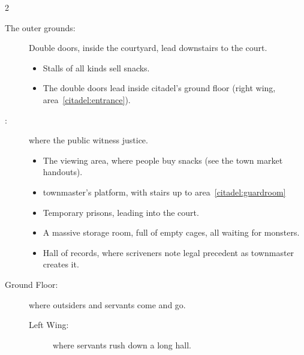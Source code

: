 \begin{multicols}{2}
\null
\begin{description}
  \item[The outer grounds:]
  Double doors, inside the courtyard, lead downstairs to the \gls{court}.
  \begin{itemize}
    \item
    Stalls of all kinds sell snacks.
    \item
    The double doors lead inside \gls{citadel}'s ground floor (right wing, \gls{area}~\ref{citadel:entrance}).
  \end{itemize}
  \item[:]
  where the public witness justice.
  \begin{itemize}
    \item
    The viewing area, where people buy snacks (see the town market handouts).
    \item
    \Gls{townmaster}'s platform, with stairs up to \gls{area}~\ref{citadel:guardroom}
    \label{citadel:watch}
    \item
    Temporary prisons, leading into the \gls{court}.
    \item
    A massive storage room, full of empty cages, all waiting for \glspl{monster}.
    \item
    Hall of records, where \glspl{scrivener} note legal precedent as \gls{townmaster} creates it.
  \end{itemize}
  \item[Ground Floor:]
  where outsiders and servants come and go.
    \begin{description}
      \item[Left Wing:]
      where servants rush down a long hall.
\end{description}
\end{description}
\end{multicols}

